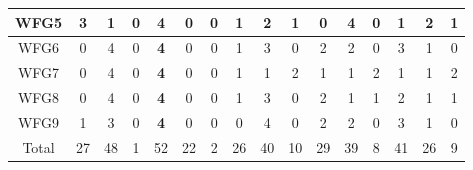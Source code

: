 \begin{table}[h]
{\begin{tabular}{|c|c|c|c|c|c|c|c|c|c|c|c|c|c|c|c|}
WFG5 & 3 & 1 & 0 & \textbf{4} & 0 & 0 & 1 & 2 & 1 & 0 & 4 & 0 & 1 & 2 & 1 \\ \hline
WFG6 & 0 & 4 & 0 & \textbf{4} & 0 & 0 & 1 & 3 & 0 & 2 & 2 & 0 & 3 & 1 & 0 \\ \hline
WFG7 & 0 & 4 & 0 & \textbf{4} & 0 & 0 & 1 & 1 & 2 & 1 & 1 & 2 & 1 & 1 & 2 \\ \hline
WFG8 & 0 & 4 & 0 & \textbf{4} & 0 & 0 & 1 & 3 & 0 & 2 & 1 & 1 & 2 & 1 & 1 \\ \hline
WFG9 & 1 & 3 & 0 & \textbf{4} & 0 & 0 & 0 & 4 & 0 & 2 & 2 & 0 & 3 & 1 & 0 \\ \hline
Total & 27 & 48 & 1 & 52 & 22 & 2 & 26 & 40 & 10 & 29 & 39 & 8 & 41 & 26 & 9 \\ \hline
\end{tabular}%
}
\end{table}


